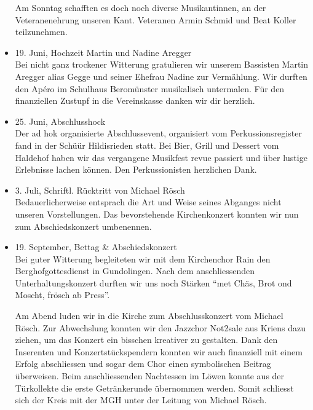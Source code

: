 \begin{history}
\begin{itemize}
        Am Sonntag schafften es doch noch diverse Musikantinnen, an der
        Veteranenehrung unseren Kant. Veteranen Armin Schmid und Beat Koller
        teilzunehmen.

        \item[]19. Juni, Hochzeit Martin und Nadine Aregger\\
        Bei nicht ganz trockener Witterung gratulieren wir unserem Bassisten
        Martin Aregger alias Gegge und seiner Ehefrau Nadine zur Vermählung. Wir
        durften den Apéro im Schulhaus Beromünster musikalisch untermalen. Für
        den finanziellen Zustupf in die Vereinskasse danken wir dir herzlich.

        \item[]25. Juni, Abschlusshock\\
        Der ad hok organisierte Abschlussevent, organisiert vom
        Perkussionsregister fand in der Schüür Hildisrieden statt. Bei Bier,
        Grill und Dessert vom Haldehof haben wir das vergangene Musikfest revue
        passiert und über lustige Erlebnisse lachen können. Den Perkussionisten
        herzlichen Dank.

        \item[]3. Juli, Schriftl. Rücktritt von Michael Rösch\\
        Bedauerlicherweise entsprach die Art und Weise
        seines Abganges nicht unseren Vorstellungen. Das bevorstehende
        Kirchenkonzert konnten wir nun zum Abschiedskonzert umbenennen.

        \item[]19. September, Bettag \& Abschiedskonzert\\
        Bei guter Witterung begleiteten wir mit dem Kirchenchor Rain den
        Berghofgottesdienst in Gundolingen. Nach dem anschliessenden
        Unterhaltungskonzert durften wir uns noch Stärken \enquote{met Chäs, Brot ond
            Moscht, frösch ab Press}.

        Am Abend luden wir in die Kirche zum Abschlusskonzert vom Michael Rösch.
        Zur Abwechslung konnten wir den Jazzchor Not2sale aus Kriens dazu
        ziehen, um das Konzert ein bisschen kreativer zu gestalten. Dank den
        Inserenten und Konzertstückspendern konnten wir auch finanziell mit einem
        Erfolg abschliessen und sogar dem Chor einen symbolischen Beitrag
        überweisen. Beim anschliessenden Nachtessen im Löwen konnte aus der
        Türkollekte die erste Getränkerunde übernommen werden. Somit schliesst
        sich der Kreis mit der MGH unter der Leitung von Michael Rösch.


\end{itemize}
\end{history}
